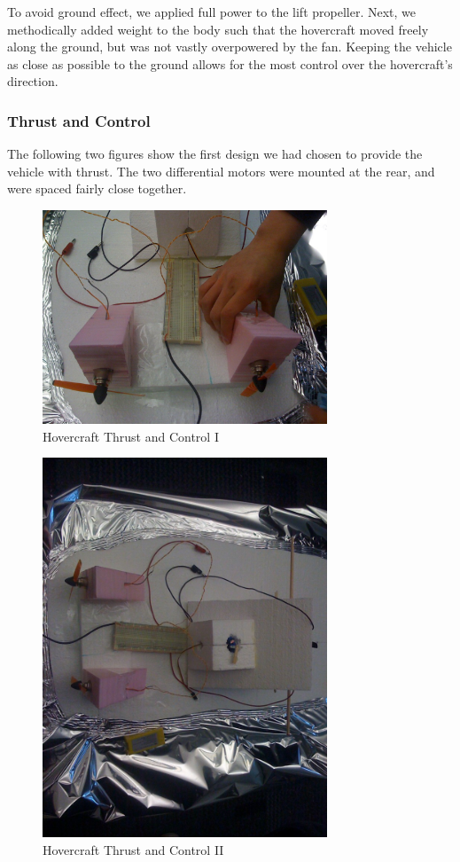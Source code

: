 To avoid ground effect, we applied full power to the lift propeller. Next, we methodically added weight to the body such that the hovercraft moved freely along the ground, but was not vastly overpowered by the fan. Keeping the vehicle as close as possible to the ground allows for the most control over the hovercraft's direction.

\subsubsection{Thrust and Control}

The following two figures show the first design we had chosen to provide the vehicle with thrust. The two differential motors were mounted at the rear, and were spaced fairly close together.

\begin{figure}[h]
  \begin{center}
    \includegraphics[width=85mm]{imageSources/thrustControl1.png}
  \end{center}
  \caption{Hovercraft Thrust and Control I} 
  \label{thrustControl1}
\end{figure}

\begin{figure}[h]
  \begin{center}
    \includegraphics[width=85mm]{imageSources/thrustControl2.png}
  \end{center}
  \caption{Hovercraft Thrust and Control II} 
  \label{thrustControl2}
\end{figure}

